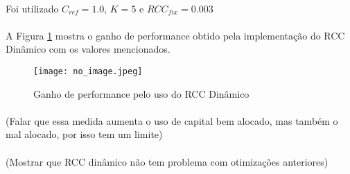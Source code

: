 \paragraph{} Foi utilizado \begin{math} C_{ref} = 1.0 \end{math}, \begin{math} K = 5 \end{math} e \begin{math} RCC_{fix} = 0.003 \end{math}

\paragraph{} A Figura \ref{fig:150} mostra o ganho de performance obtido pela implementação do RCC Dinâmico com os valores mencionados.

\begin{figure}[h]
    \texttt{[image: no\_image.jpeg]}
    \centering
    \caption{Ganho de performance pelo uso do RCC Dinâmico}
    \label{fig:150}
\end{figure}

\paragraph{} (Falar que essa medida aumenta o uso de capital bem alocado, mas também o mal alocado, por isso tem um limite)

\paragraph{} (Mostrar que RCC dinâmico não tem problema com otimizações anteriores)






